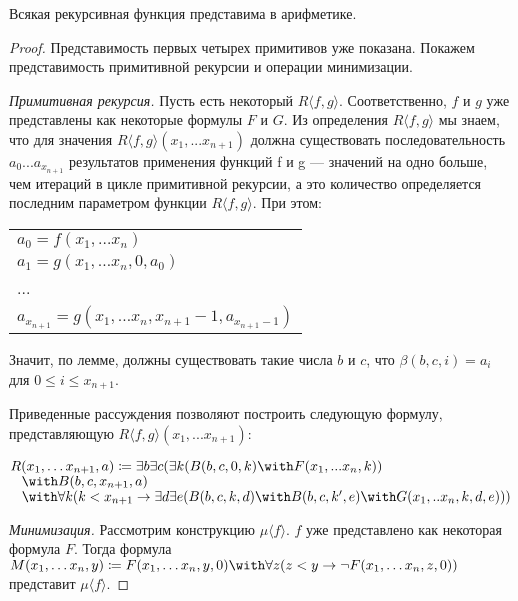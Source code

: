 \begin{theorem}Всякая рекурсивная функция представима в арифметике.\end{theorem}
\begin{proof}
Представимость первых четырех примитивов уже показана. Покажем представимость примитивной рекурсии и 
операции минимизации.

\emph{Примитивная рекурсия.} Пусть есть некоторый $R \langle{} f,g \rangle$. Соответственно, $f$ и $g$ уже 
представлены как некоторые формулы $F$ и $G$. Из определения $R\langle{}f,g\rangle$ мы знаем,
что для значения $R \langle{} f,g \rangle (x_1,...x_{n+1})$ должна существовать последовательность
$a_0 ... a_{x_{n+1}}$ результатов применения функций f и g --- значений на одно больше, чем 
итераций в цикле примитивной рекурсии,
а это количество определяется последним параметром функции $R \langle{}f,g\rangle$. При этом:

\begin{tabular}{l}
$a_0 = f(x_1, \dots x_n)$\\
$a_1 = g(x_1, \dots x_n,0,a_0)$\\
...\\
$a_{x_{n+1}} = g(x_1, \dots x_n, x_{n+1}-1,a_{x_{n+1}-1})$
\end{tabular}

Значит, по лемме, должны существовать такие числа $b$ и $c$, что
$\beta (b,c,i) = a_i$ для $0 \le i \le x_{n+1}$.

Приведенные рассуждения позволяют построить следующую формулу, представляющую $R\langle{}f,g\rangle (x_1, ... x_{n+1})$:

\begin{center}
$R(x_1, \dots x_{n+1}, a) \coloneqq  \exists b \exists c (\exists k (B (b,c,0,k) \with F (x_1,...x_n, k))$\\
       $\;\;\;\with B (b,c,x_{n+1},a)$\\
       $\;\;\;\with \forall k (k < x_{n+1} \rightarrow \exists d \exists e (B (b,c,k,d) \with B (b,c,k',e) \with
           G (x_1,..x_n,k,d,e)))$
\end{center}

\emph{Минимизация.} Рассмотрим конструкцию $\mu\langle{}f\rangle$. $f$ уже представлено 
как некоторая формула $F$. Тогда формула 
$M (x_1, \dots x_n,y) \coloneqq  F(x_1, \dots x_n,y,0) \with \forall z (z < y \rightarrow \neg F (x_1, \dots x_n,z,0))$
представит $\mu\langle{}f\rangle$.
\end{proof}

